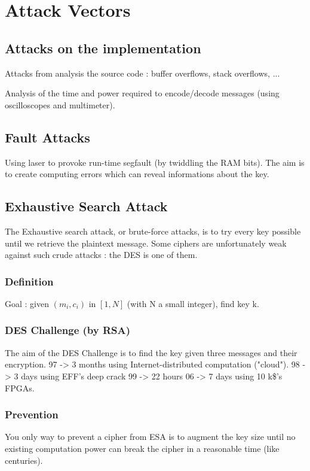 \chapter{Attack Vectors}

\section{Attacks on the implementation}
Attacks from analysis the source code : buffer overflows, stack overflows, ...

Analysis of the time and power required to encode/decode messages (using oscilloscopes and multimeter).

\section{Fault Attacks}
Using laser to provoke run-time segfault (by twiddling the RAM bits). The aim is to create computing errors which can reveal informations about the key.

\section{Exhaustive Search Attack}
    The Exhaustive search attack, or brute-force attacks, is to try every key possible until we retrieve the plaintext message.
    Some ciphers are unfortunately weak against such crude attacks : the DES is one of them.
    
\subsection{Definition}
Goal : given $(m_i,c_i)$ in $[1,N]$ (with N a small integer), find key k.

\subsection{DES Challenge (by RSA)}
The aim of the DES Challenge is to find the key given three messages and their encryption.
97 -> 3 months using Internet-distributed computation ("cloud").
98 -> 3 days using EFF's deep crack
99 -> 22 hours
06 -> 7 days using 10 k\$'s FPGAs.

\subsection{Prevention}
You only way to prevent a cipher from ESA is to augment the key size until no existing computation power can break the cipher in a reasonable time (like centuries).

